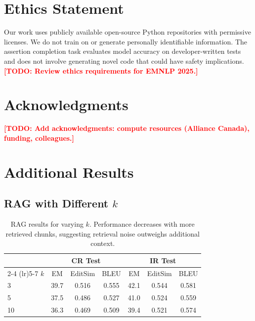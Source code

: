 \documentclass[11pt]{article}
\newcommand{\todo}[1]{\textcolor{red}{\textbf{[TODO: #1]}}}
\begin{document}
\section*{Ethics Statement}

Our work uses publicly available open-source Python repositories with permissive licenses.
We do not train on or generate personally identifiable information.
The assertion completion task evaluates model accuracy on developer-written tests and does not involve generating novel code that could have safety implications.
\todo{Review ethics requirements for EMNLP 2025.}

\section*{Acknowledgments}

\todo{Add acknowledgments: compute resources (Alliance Canada), funding, colleagues.}




\appendix

\section{Additional Results}
\label{app:additional_results}

\subsection{RAG with Different $k$}

\begin{table}[h]
\centering
\small
\begin{tabular}{lccc@{\hskip 12pt}ccc}
\toprule
& \multicolumn{3}{c}{CR Test} & \multicolumn{3}{c}{IR Test} \\
\cmidrule(lr){2-4} \cmidrule(lr){5-7}
$k$ & EM & EditSim & BLEU & EM & EditSim & BLEU \\
\midrule
3 & 39.7 & 0.516 & 0.555 & 42.1 & 0.544 & 0.581 \\
5 & 37.5 & 0.486 & 0.527 & 41.0 & 0.524 & 0.559 \\
10 & 36.3 & 0.469 & 0.509 & 39.4 & 0.521 & 0.574 \\
\bottomrule
\end{tabular}
\caption{RAG results for varying $k$. Performance decreases with more retrieved chunks, suggesting retrieval noise outweighs additional context.}
\label{tab:rag_k}
\end{table}
\end{document}
